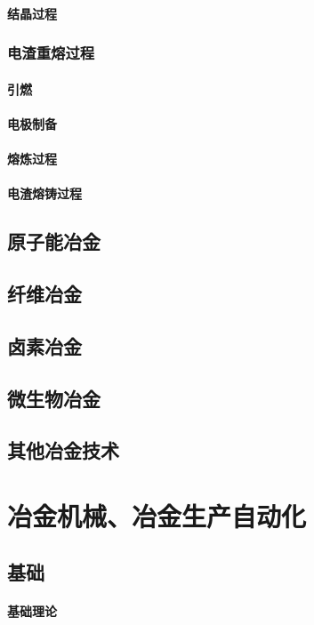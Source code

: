 \documentclass[UTF8]{../../ApplicationUniverse}
\begin{document}
        \subsubsection{结晶过程}
    \subsection{电渣重熔过程}
        \subsubsection{引燃}
        \subsubsection{电极制备}
        \subsubsection{熔炼过程}
        \subsubsection{电渣熔铸过程}
\section{原子能冶金}
\section{纤维冶金}
\section{卤素冶金}
\section{微生物冶金}
\section{其他冶金技术}







\chapter{冶金机械、冶金生产自动化}
\section{基础}
    \subsubsection{基础理论}
\end{document}
